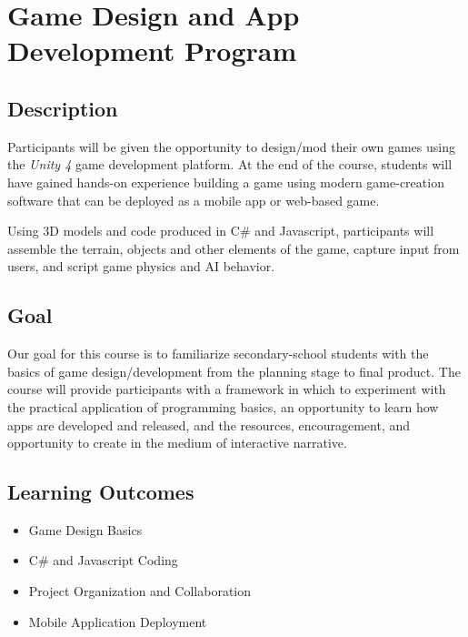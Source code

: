 \documentclass[letterpaper,10pt,english]{sphinxmanual}
\begin{document}
\chapter{Game Design and App Development Program}
\label{gamedev::doc}\label{gamedev:index-0}\label{gamedev:game-design-and-app-development-program}

\section{Description}
\label{gamedev:description}
Participants will be given the opportunity to design/mod their own games using the \emph{Unity 4} game development platform. At the end of the course, students will have gained hands-on experience building a game using modern game-creation software that can be deployed as a mobile app or web-based game.

Using 3D models and code produced in C\# and Javascript, participants will assemble the terrain, objects and other elements of the game, capture input from users, and script game physics and AI behavior.


\section{Goal}
\label{gamedev:goal}
Our goal for this course is to familiarize secondary-school students with the basics of game design/development from the planning stage to final product. The course will provide participants with a framework in which to experiment with the practical application of programming basics, an opportunity to learn how apps are developed and released, and the resources, encouragement, and opportunity to create in the medium of interactive narrative.


\section{Learning Outcomes}
\label{gamedev:learning-outcomes}\begin{itemize}
\item {} 
Game Design Basics

\item {} 
C\# and Javascript Coding

\item {} 
Project Organization and Collaboration

\item {} 
Mobile Application Deployment

\end{itemize}
\end{document}
